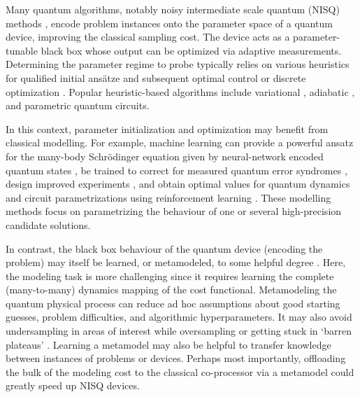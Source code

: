 \documentclass[aps, twocolumn,superscriptaddress]{revtex4-1}
\begin{document}
Many quantum algorithms, notably noisy intermediate scale quantum (NISQ) methods \cite{arute2019quantum,zhong2020quantum,preskill2018quantum, peruzzo2014variational,kandala2017hardware, kokail2019self, farhi2000quantum,omran2019generation, farhi2014quantum, harrigan2021quantum}, encode problem instances onto the parameter space of a quantum device, improving the classical sampling cost. The device acts as a parameter-tunable black box whose output can be optimized via adaptive measurements. Determining the parameter regime to probe typically relies on various heuristics for qualified initial ansätze and subsequent optimal control \cite{glaser2015training,theis2018counteracting, muller2021one} or discrete optimization \cite{maslov2008quantum,motzoi2017linear, yao2020policy, zhu2020adaptive}. Popular heuristic-based algorithms include variational \cite{peruzzo2014variational,kandala2017hardware, kokail2019self}, adiabatic \cite{farhi2000quantum,omran2019generation}, and parametric \cite{farhi2014quantum, harrigan2021quantum} quantum circuits. 

In this context, parameter initialization and optimization may benefit from classical modelling. For example, machine learning can provide a powerful ansatz for the many-body Schrödinger equation given by neural-network encoded quantum states \cite{carleo2017solving, schmitt2020quantum}, be trained to correct for measured quantum error syndromes \cite{liu2019neural}, design improved experiments \cite{goerz2017charting,menke2021automated}, and obtain optimal values for quantum dynamics and circuit parametrizations using reinforcement learning \cite{bukov2018reinforcement,niu2019universal,dalgaard2020global}. These modelling methods focus on parametrizing the behaviour of one or several high-precision candidate solutions.  

In contrast, the black box behaviour of the quantum device (encoding the problem) may itself be learned, or metamodeled, to some helpful degree \cite{wigley2016fast, bentley2018gaussian, kokail2019self, sauvage2020optimal, paulson2020towards,koczor2019quantum}. Here, the modeling task is more challenging since it requires learning the complete (many-to-many) dynamics mapping of the cost functional.
Metamodeling the quantum physical process can reduce ad hoc assumptions about good starting guesses, problem difficulties, and algorithmic hyperparameters. It may also avoid undersampling in areas of interest while oversampling or getting stuck in `barren plateaus' \cite{mcclean2018barren}. Learning a metamodel may also be helpful to transfer knowledge between instances of problems or devices. Perhaps most importantly, offloading the bulk of the modeling cost to the classical co-processor via a metamodel could greatly speed up NISQ devices. 
\end{document}
